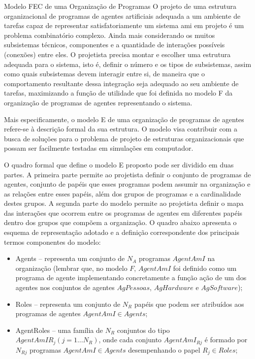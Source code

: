 \begin{section}{Modelo FEC de uma Organização de Programas}
    O projeto de uma estrutura organizacional de programas de agentes artificiais adequada a um ambiente de tarefas capaz de representar satisfatoriamente um sistema \acrshort{ami} em projeto é um problema combinatório complexo. Ainda mais considerando os muitos subsistemas técnicos, componentes e a quantidade de interações possíveis (conexões) entre eles. O projetista precisa montar e escolher uma estrutura adequada para o sistema, isto é, definir o número e os tipos de subsistemas, assim como quais subsistemas devem interagir entre si, de maneira que o comportamento resultante dessa integração seja adequado ao seu ambiente de tarefas, maximizando a função de utilidade que foi definida no modelo F da organização de programas de agentes representando o sistema. 
    
    Mais especificamente, o modelo E de uma organização de programas de agentes refere-se à descrição formal da sua estrutura. O modelo visa contribuir com a busca de soluções para o problema de projeto de estruturas organizacionais que possam ser facilmente testadas em simulações em computador. 
    
    O quadro formal que define o modelo E proposto pode ser dividido em duas partes. A primeira parte permite ao projetista definir o conjunto de programas de agentes, conjunto de papéis que esses programas podem assumir na organização e as relações entre esses papéis, além dos grupos de programas e a cardinalidade destes grupos. A segunda parte do modelo permite ao projetista definir o mapa das interações que ocorrem entre os programas de agentes em diferentes papéis dentro dos grupos que compõem a organização. O quadro abaixo apresenta o esquema de representação adotado e a definição correspondente dos principais termos componentes do modelo:
    
    \begin{itemize}
    
        \item Agents -- representa um conjunto de $N_A$ programas $AgentAmI$ na organização (lembrar que, no modelo $F$, $AgentAmI$ foi definido como um programa de agente implementando concretamente a função ação de um dos agentes nos conjuntos de agentes $AgPessoas$, $AgHardware$ e $AgSoftware$);
        
        \item Roles -- representa um conjunto de $N_R$ papéis que podem ser atribuídos aos programas de agentes $AgentAmI \in Agents$;
        
        \item AgentRoles -- uma família de $N_R$ conjuntos do tipo $AgentAmIR_j (j = 1 \ldots N_R)$, onde cada conjunto $AgentAmI_{Rj}$ é formado por $N_{Rj}$ programas $AgentAmI \in Agents$ desempenhando o papel $R_j \in Roles$;
        

\end{itemize}
\end{section}
